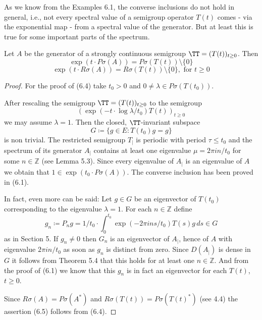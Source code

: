 	

\newpage
As we know from the Examples 6.1, the converse inclusions do not hold in general, i.e., not every spectral value of a semigroup operator $T(t)$ comes - via the exponential map - from a spectral value of the generator.
But at least this is true for some important parts of the spectrum.
\begin{theorem}\label{thm:a3-6.3}
	
	Let $A$ be the generator of a strongly continuous semigroup $\TT = (T(t))_{t \geq 0}$.
	Then
	\begin{equation}\label{eq:a3-6.4}
		\exp(t \cdot P\sigma(A)) = P\sigma(T(t)) \setminus \{0\}
	\end{equation}
	\begin{equation}\label{eq:a3-6.5}
		\exp(t \cdot R\sigma(A)) = R\sigma(T(t)) \setminus \{0\}, \text{ for } t \geq 0
	\end{equation}
\end{theorem}

\begin{proof}
	For the proof of (6.4) take $t_{0} > 0$ and $0 \neq \lambda \in P\sigma(T(t_{0}))$.
	
	After rescaling the semigroup $\TT = (T(t))_{t \geq 0}$ to the semigroup 
	\[
	(\exp(-t \cdot \log\lambda/t_{0})T(t))_{t \geq 0}
	\]
	 we may assume $\lambda = 1$. Then the closed, $\TT$-invariant subspace
	\[
	G \coloneqq \{g \in E \colon T(t_{0})g = g\}
	\]
	is non trivial.
	The restricted semigroup $T_{|}$ is periodic with period $\tau \leq t_{0}$ and the spectrum of its generator $A_{|}$ contains at least one eigenvalue $\mu = 2\pi in/t_{0}$ for some $n \in \mathbb{Z}$ (see Lemma 5.3).
	Since every eigenvalue of $A_{|}$ is an eigenvalue of $A$ we obtain that $1 \in \exp(t_{0} \cdot P\sigma(A))$.
	The converse inclusion has been proved in (6.1).
	
	In fact, even more can be said: Let $g \in G$ be an eigenvector of $T(t_{0})$ corresponding to the eigenvalue $\lambda = 1$.
	For each $n \in \mathbb{Z}$ define
	\[
	g_{n} \coloneqq P_{n}g = 1/t_{0} \cdot \int_{0}^{t_{0}} \exp(-2\pi ins/t_{0})T(s)g \, ds \in G
	\]
	as in Section 5.
	If $g_{n} \ne 0$ then $G_n$ is an eigenvector of $A_{|}$, hence of $A$ with eigenvalue $2\pi in/t_{0}$ as soon as $g_{n}$ is distinct from zero.
	Since $D(A_{|})$ is dense in $G$ it follows from Theorem 5.4 that this holds for at least one $n \in \mathbb{Z}$.
	And from the proof of (6.1) we know that this $g_{n}$ is in fact an eigenvector for each $T(t)$, $t \geq 0$.
	
	Since $R\sigma(A) = P\sigma(A^*)$ and $R\sigma(T(t)) = P\sigma(T(t)^*)$ (see 4.4) the assertion (6.5) follows from (6.4).
\end{proof}

